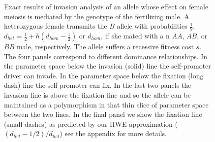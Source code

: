 \documentclass[12pt,letterpaper]{article}
\begin{document}
\begin{figure}
\caption{Exact results of invasion analysis of an allele whose effect
 on female meiosis is mediated by the genotype of the fertilizing
 male.  
 A heterozygous female transmits the $B$ allele 
  with probabilities  $\frac{1}{2}$,  $d_{het}=\frac{1}{2} + h(d_{hom}-\frac{1}{2}) $ or $d_{hom}$, 
 if she mated with a n $AA$, $AB$, or $BB$ male,  respectively.  
 The allele suffers a recessive fitness cost $s$.  
 The four panels correspond to different dominance relationships.
In the parameter space below the invasion (solid) line the self-promoter
 driver can invade. In the parameter space below the fixation (long
 dash) line the self-promoter can fix. In the last
 two panels the invasion line is above the fixation line and so the
 allele can be maintained as a polymorphism in that thin slice of
 parameter space between the two lines. 
 In the final panel we show the
  fixation line (small dashes) as predicted by our HWE approximation
  ($(d_{het}-1/2)/d_{het}$) see the appendix for more details.
}  \label{Effect_of_dominance}
\end{figure}
\end{document}
